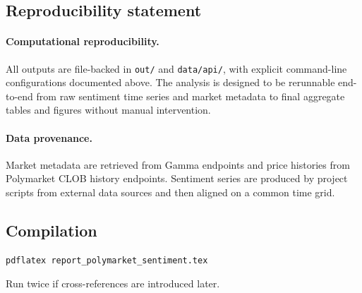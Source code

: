 \documentclass[11pt]{article}
\begin{document}
\subsection{Reproducibility statement}
\paragraph{Computational reproducibility.}
All outputs are file-backed in \texttt{out/} and \texttt{data/api/}, with explicit command-line configurations documented above. The analysis is designed to be rerunnable end-to-end from raw sentiment time series and market metadata to final aggregate tables and figures without manual intervention.
\paragraph{Data provenance.}
Market metadata are retrieved from Gamma endpoints and price histories from Polymarket CLOB history endpoints. Sentiment series are produced by project scripts from external data sources and then aligned on a common time grid.

\subsection{Compilation}
\begin{verbatim}
pdflatex report_polymarket_sentiment.tex
\end{verbatim}
Run twice if cross-references are introduced later.
\end{document}
